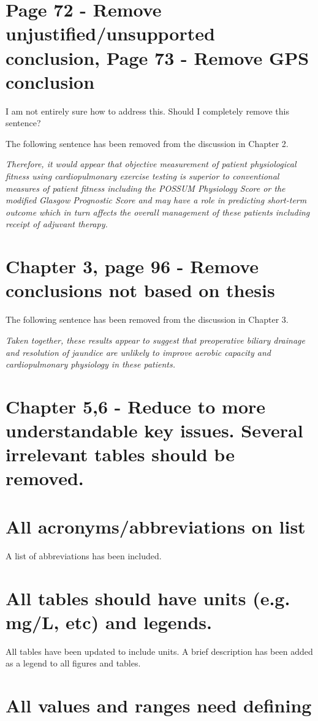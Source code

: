 \documentclass[12pt,a4paper]{article}
\begin{document}
\section{Page 72 - Remove unjustified/unsupported conclusion, Page 73 - Remove GPS conclusion}

I am not entirely sure how to address this. Should I completely remove this sentence? 

The following sentence has been removed from the discussion in Chapter 2. 

\textit{Therefore, it would appear that objective measurement of patient physiological fitness using cardiopulmonary exercise testing is superior to conventional measures of patient fitness including the POSSUM Physiology Score or the modified Glasgow Prognostic Score and may have a role in predicting short-term outcome which in turn affects the overall management of these patients including receipt of adjuvant therapy.}

\section{Chapter 3, page 96 - Remove conclusions not based on thesis}

The following sentence has been removed from the discussion in Chapter 3.

\textit{Taken together, these results appear to suggest that preoperative biliary drainage and resolution of jaundice are unlikely to improve aerobic capacity and cardiopulmonary physiology in these patients.}


\section{Chapter 5,6 - Reduce to more understandable key issues. Several irrelevant tables should be removed.}

\section{All acronyms/abbreviations on list}

A list of abbreviations has been included. 

\section{All tables should have units (e.g. mg/L, etc) and legends.}

All tables have been updated to include units. A brief description has been added as a legend to all figures and tables. 

\section{All values and ranges need defining}
			
		
\end{document}
